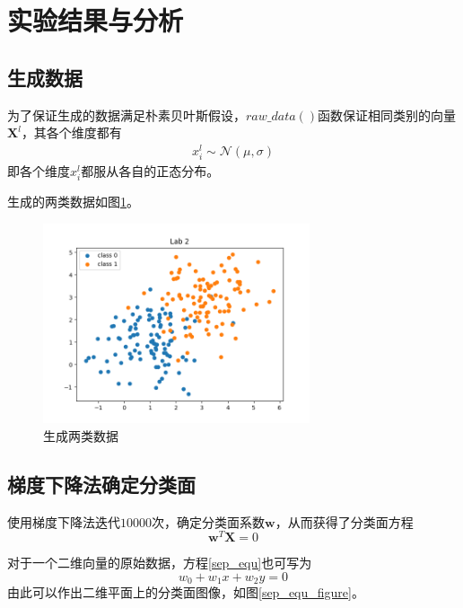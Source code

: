 \section{实验结果与分析}

\subsection{生成数据}

为了保证生成的数据满足朴素贝叶斯假设，$raw\_data()$函数保证相同类别的向量$\mathbf{X}^l$，其各个维度都有
\begin{eqnarray}
    x^l_i \sim \mathcal{N} \left(\mu, \sigma\right)
\end{eqnarray}
即各个维度$x^l_i$都服从各自的正态分布。

生成的两类数据如图\ref{gen_data}。

\begin{figure}[htbp]
    \centering
    \includegraphics[width=0.7\textwidth]{figures/Figure_1.png}
    \caption{生成两类数据}
    \label{gen_data}
\end{figure}

\subsection{梯度下降法确定分类面}

使用梯度下降法迭代$10000$次，确定分类面系数$\mathbf{w}$，从而获得了分类面方程
\begin{equation}
    \label{sep_equ}
    \mathbf{w}^T\mathbf{X}=0
\end{equation}

对于一个二维向量的原始数据，方程\ref{sep_equ}也可写为
\begin{equation}
    w_0 + w_1 x + w_2 y = 0
\end{equation}
由此可以作出二维平面上的分类面图像，如图\ref{sep_equ_figure}。

